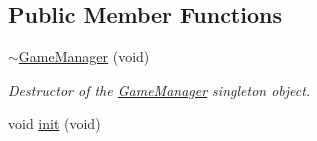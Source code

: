 \subsection*{Public Member Functions}
\begin{DoxyCompactItemize}
\item 
\hyperlink{classsparky_1_1_game_manager_a86c447860e6c1246b030224cff3429c7}{$\sim$\+Game\+Manager} (void)
\begin{DoxyCompactList}\small\item\em Destructor of the \hyperlink{classsparky_1_1_game_manager}{Game\+Manager} singleton object. \end{DoxyCompactList}\item 
void \hyperlink{classsparky_1_1_game_manager_ad56d2cc6157fb61e22384dcbfae9af5d}{init} (void)\hypertarget{classsparky_1_1_game_manager_ad56d2cc6157fb61e22384dcbfae9af5d}{}\label{classsparky_1_1_game_manager_ad56d2cc6157fb61e22384dcbfae9af5d}


\end{DoxyCompactItemize}
